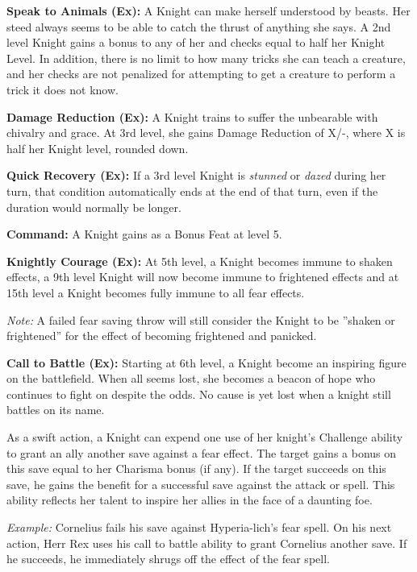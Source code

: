 \textbf{Speak to Animals (Ex):} A Knight can make herself understood by beasts. Her steed always seems to be able to catch the thrust of anything she says. A 2nd level Knight gains a bonus to any of her  and  checks equal to half her Knight Level. In addition, there is no limit to how many tricks she can teach a creature, and her  checks are not penalized for attempting to get a creature to perform a trick it does not know.

 \textbf{Damage Reduction (Ex):} A Knight trains to suffer the unbearable with chivalry and grace. At 3rd level, she gains Damage Reduction of X/-, where X is half her Knight level, rounded down.

\textbf{Quick Recovery (Ex):} If a 3rd level Knight is \textit{stunned} or \textit{dazed} during her turn, that condition automatically ends at the end of that turn, even if the duration would normally be longer.

\textbf{Command:} A Knight gains  as a Bonus Feat at level 5.

\textbf{Knightly Courage (Ex):} At 5th level, a Knight becomes immune to shaken effects, a 9th level Knight will now become immune to frightened effects and at 15th level a Knight becomes fully immune to all fear effects.

\textit{Note:} A failed fear saving throw will still consider the Knight to be ''shaken or frightened'' for the effect of becoming frightened and panicked.

\textbf{Call to Battle (Ex):} Starting at 6th level, a Knight become an inspiring figure on the battlefield. When all seems lost, she becomes a beacon of hope who continues to fight on despite the odds. No cause is yet lost when a knight still battles on its name.

As a swift action, a Knight can expend one use of her knight's Challenge ability to grant an ally another save against a fear effect. The target gains a bonus on this save equal to her Charisma bonus (if any). If the target succeeds on this save, he gains the benefit for a successful save against the attack or spell. This ability reflects her talent to inspire her allies in the face of a daunting foe.

\textit{Example:} Cornelius fails his save against Hyperia-lich's fear spell. On his next action, Herr Rex uses his call to battle ability to grant Cornelius another save. If he succeeds, he immediately shrugs off the effect of the fear spell.

